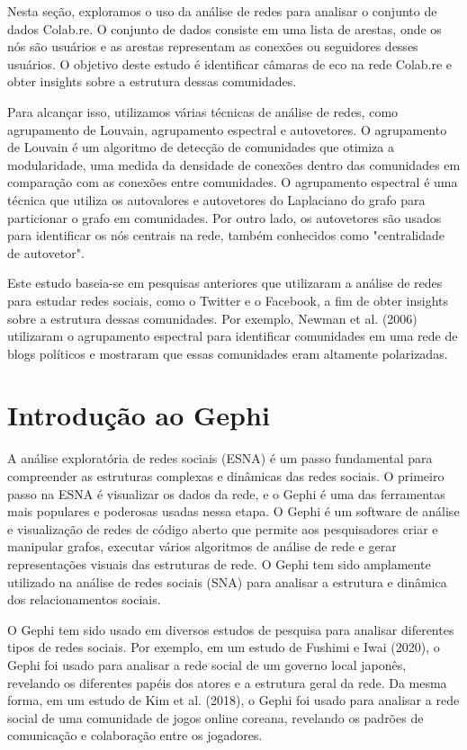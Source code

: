 Nesta seção, exploramos o uso da análise de redes para analisar o conjunto de dados Colab.re. O conjunto de dados consiste em uma lista de arestas, onde os nós são usuários e as arestas representam as conexões ou seguidores desses usuários. O objetivo deste estudo é identificar câmaras de eco na rede Colab.re e obter insights sobre a estrutura dessas comunidades.

Para alcançar isso, utilizamos várias técnicas de análise de redes, como agrupamento de Louvain, agrupamento espectral e autovetores. O agrupamento de Louvain é um algoritmo de detecção de comunidades que otimiza a modularidade, uma medida da densidade de conexões dentro das comunidades em comparação com as conexões entre comunidades. O agrupamento espectral é uma técnica que utiliza os autovalores e autovetores do Laplaciano do grafo para particionar o grafo em comunidades. Por outro lado, os autovetores são usados para identificar os nós centrais na rede, também conhecidos como "centralidade de autovetor".

Este estudo baseia-se em pesquisas anteriores que utilizaram a análise de redes para estudar redes sociais, como o Twitter e o Facebook, a fim de obter insights sobre a estrutura dessas comunidades. Por exemplo, Newman et al. (2006) utilizaram o agrupamento espectral para identificar comunidades em uma rede de blogs políticos e mostraram que essas comunidades eram altamente polarizadas.

\section{Introdução ao Gephi}

A análise exploratória de redes sociais (ESNA) é um passo fundamental para compreender as estruturas complexas e dinâmicas das redes sociais. O primeiro passo na ESNA é visualizar os dados da rede, e o Gephi é uma das ferramentas mais populares e poderosas usadas nessa etapa. O Gephi é um software de análise e visualização de redes de código aberto que permite aos pesquisadores criar e manipular grafos, executar vários algoritmos de análise de rede e gerar representações visuais das estruturas de rede. O Gephi tem sido amplamente utilizado na análise de redes sociais (SNA) para analisar a estrutura e dinâmica dos relacionamentos sociais.

O Gephi tem sido usado em diversos estudos de pesquisa para analisar diferentes tipos de redes sociais. Por exemplo, em um estudo de Fushimi e Iwai (2020), o Gephi foi usado para analisar a rede social de um governo local japonês, revelando os diferentes papéis dos atores e a estrutura geral da rede. Da mesma forma, em um estudo de Kim et al. (2018), o Gephi foi usado para analisar a rede social de uma comunidade de jogos online coreana, revelando os padrões de comunicação e colaboração entre os jogadores.

